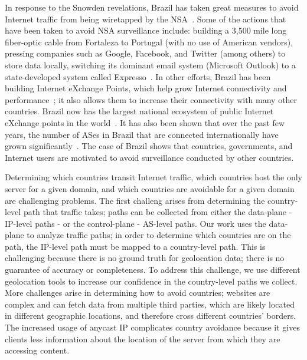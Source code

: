 In response to the Snowden revelations, Brazil has taken great measures to avoid Internet traffic from being wiretapped by the NSA~\cite{brazil_history, brazil_break_from_US, brazil_conference, brazil_conference2, brazil_human_rights}.  Some of the actions that have been taken to avoid NSA surveillance include: building a 3,500 mile long fiber-optic cable from Fortaleza to Portugal (with no use of American vendors), pressing companies such as Google, Facebook, and Twitter (among others) to store data locally, switching its dominant email system (Microsoft Outlook) to a state-developed system called Expresso~\cite{brazil_cable, brazil_us_companies}.  In other efforts, Brazil has been building Internet eXchange Points, which help grow Internet connectivity and performance~\cite{brazil_IXP1, brazil_IXP2}; it also allows them to increase their connectivity with many other countries.  Brazil now has the largest national ecosystem of public Internet eXchange points in the world~\cite{brazil_ixp_ecosystem}.  It has also been shown that over the past few years, the number of ASes in Brazil that are connected internationally have grown significantly~\cite{brazil_international_ases}.  The case of Brazil shows that countries, governments, and Internet users are motivated to avoid surveillance conducted by other countries.

Determining which countries transit Internet traffic, which countries host the only server for a given domain, and which countries are avoidable for a given domain are challenging problems.  The first challeng arises from determining the country-level path that traffic takes; paths can be collected from either the data-plane - IP-level paths - or the control-plane - AS-level paths.  Our work uses the data-plane to analyze traffic paths; in order to determine which countries are on the path, the IP-level path must be mapped to a country-level path.  This is challenging because there is no ground truth for geolocation data; there is no guarantee of accuracy or completeness.  To address this challenge, we use different geolocation tools to increase our confidence in the country-level paths we collect.  More challenges arise in determining how to avoid countries; websites are complex and can fetch data from multiple third parties, which are likely located in different geographic locations, and therefore cross different countries' borders.  The increased usage of anycast IP complicates country avoidance because it gives clients less information about the location of the server from which they are accessing content.  

